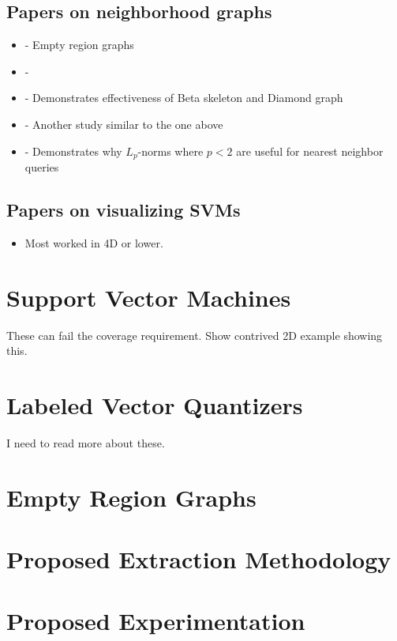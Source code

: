 \documentclass[12pt]{article}
\begin{document}
\subsection{Papers on neighborhood graphs}

\begin{itemize}
	\item \cite{CardinalColletteLangerman2009} - Empty region graphs
	\item \cite{} - 
	\item \cite{CorreaLindstrom2011} - Demonstrates effectiveness of Beta skeleton and Diamond graph
	\item \cite{MaljovecSahaLindstrom2013} - Another study similar to the one above
	\item \cite{AggarwalHinneburgKeim2001} - Demonstrates why $L_p$-norms where $p<2$ are useful for nearest neighbor queries
\end{itemize}

\subsection{Papers on visualizing SVMs}

\begin{itemize}
	\item Most worked in 4D or lower.
\end{itemize}

\section{Support Vector Machines}

These can fail the coverage requirement. Show contrived 2D example showing this.

\section{Labeled Vector Quantizers}

I need to read more about these.

\section{Empty Region Graphs}

\section{Proposed Extraction Methodology}

\section{Proposed Experimentation}
\end{document}
